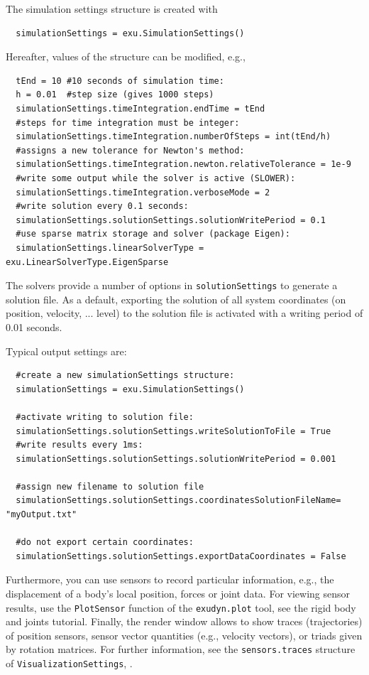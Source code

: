 \noindent The simulation settings structure is created with 
\pythonstyle\begin{lstlisting}
  simulationSettings = exu.SimulationSettings()
\end{lstlisting}
%
Hereafter, values of the structure can be modified, e.g.,
\pythonstyle\begin{lstlisting}
  tEnd = 10 #10 seconds of simulation time:
  h = 0.01  #step size (gives 1000 steps)
  simulationSettings.timeIntegration.endTime = tEnd
  #steps for time integration must be integer:
  simulationSettings.timeIntegration.numberOfSteps = int(tEnd/h)
  #assigns a new tolerance for Newton's method:
  simulationSettings.timeIntegration.newton.relativeTolerance = 1e-9 
  #write some output while the solver is active (SLOWER):
  simulationSettings.timeIntegration.verboseMode = 2                 
  #write solution every 0.1 seconds:
  simulationSettings.solutionSettings.solutionWritePeriod = 0.1      
  #use sparse matrix storage and solver (package Eigen):
  simulationSettings.linearSolverType = exu.LinearSolverType.EigenSparse 
\end{lstlisting}

%
The solvers provide a number of options in \texttt{solutionSettings} to generate a solution file. As a default, exporting the solution of all system coordinates (on position, velocity, ... level) to the solution file is activated with a writing period of 0.01 seconds.

\noindent Typical output settings are:
\pythonstyle\begin{lstlisting}
  #create a new simulationSettings structure:
  simulationSettings = exu.SimulationSettings()
  
  #activate writing to solution file:
  simulationSettings.solutionSettings.writeSolutionToFile = True
  #write results every 1ms:
  simulationSettings.solutionSettings.solutionWritePeriod = 0.001
  
  #assign new filename to solution file
  simulationSettings.solutionSettings.coordinatesSolutionFileName= "myOutput.txt"

  #do not export certain coordinates:
  simulationSettings.solutionSettings.exportDataCoordinates = False
\end{lstlisting}

Furthermore, you can use sensors to record particular information, e.g., the displacement of a body's local
position, forces or joint data. For viewing sensor results, use the \texttt{PlotSensor} function of the 
\texttt{exudyn.plot} tool, see the rigid body and joints tutorial.
Finally, the render window allows to show traces (trajectories) of position sensors, sensor vector quantities (e.g., velocity vectors),
or triads given by rotation matrices. For further information, see the \texttt{sensors.traces} structure of \texttt{VisualizationSettings}, .

